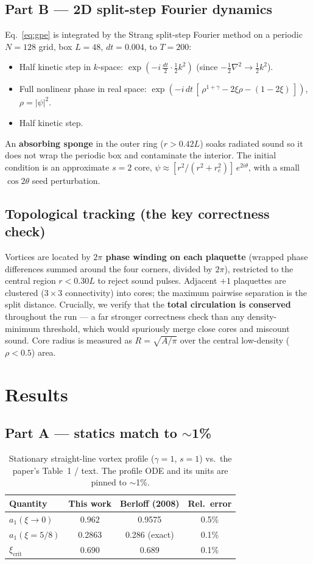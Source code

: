 \documentclass[11pt]{article}
\begin{document}
\subsection{Part B --- 2D split-step Fourier dynamics}
Eq.~\eqref{eq:gpe} is integrated by the Strang split-step Fourier method on a
periodic $N{=}128$ grid, box $L=48$, $dt=0.004$, to $T=200$:
\begin{itemize}
  \item Half kinetic step in $k$-space:
        $\exp(-i\,\tfrac{dt}{2}\cdot\tfrac{1}{2}k^2)$ (since
        $-\tfrac12\nabla^2\to\tfrac12 k^2$).
  \item Full nonlinear phase in real space:
        $\exp(-i\,dt\,[\,\rho^{1+\gamma}-2\xi\rho-(1-2\xi)\,])$,
        $\rho=|\psi|^2$.
  \item Half kinetic step.
\end{itemize}
An \textbf{absorbing sponge} in the outer ring ($r>0.42L$) soaks radiated sound
so it does not wrap the periodic box and contaminate the interior. The initial
condition is an approximate $s=2$ core, $\psi\approx
[r^2/(r^2+r_c^2)]\,e^{2i\theta}$, with a small $\cos2\theta$ seed perturbation.

\subsection{Topological tracking (the key correctness check)}
Vortices are located by \textbf{$2\pi$ phase winding on each plaquette}
(wrapped phase differences summed around the four corners, divided by $2\pi$),
restricted to the central region $r<0.30L$ to reject sound pulses. Adjacent
$+1$ plaquettes are clustered ($3\times3$ connectivity) into cores; the maximum
pairwise separation is the split distance. Crucially, we verify that the
\textbf{total circulation is conserved} throughout the run --- a far stronger
correctness check than any density-minimum threshold, which would spuriously
merge close cores and miscount sound. Core radius is measured as
$R=\sqrt{A/\pi}$ over the central low-density ($\rho<0.5$) area.

\section{Results}
\subsection{Part A --- statics match to $\sim$1\%}
\begin{table}[h]
\centering
\begin{tabular}{lccc}
\toprule
Quantity & This work & Berloff (2008) & Rel.\ error \\
\midrule
$a_1(\xi\!\to\!0)$        & 0.962  & 0.9575 & 0.5\% \\
$a_1(\xi=5/8)$            & 0.2863 & 0.286 (exact) & 0.1\% \\
$\xi_{\mathrm{crit}}$     & 0.690  & 0.689  & 0.1\% \\
\bottomrule
\end{tabular}
\caption{Stationary straight-line vortex profile ($\gamma=1$, $s=1$) vs.\ the
paper's Table~1 / text. The profile ODE and its units are pinned to $\sim$1\%.}
\end{table}
\end{document}
